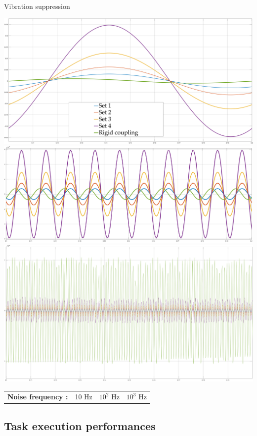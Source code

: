 \documentclass[10pt]{beamer}
\begin{document}
\begin{frame}{Vibration suppression}
  \begin{center}
    \includegraphics[width=\textwidth, height=0.21\textwidth]{../reportTeleop/Images/vibr10Htz}\\
    \smallskip
    \includegraphics[width=\textwidth, height=0.21\textwidth]{../reportTeleop/Images/vibr100Htz}\\
    \smallskip
    \includegraphics[width=\textwidth, height=0.21\textwidth]{../reportTeleop/Images/vibr1000Htz}\\
    \begin{tabular}{c  c | c | c }
      \textbf{ Noise frequency :} & 10 Hz & $10^2$ Hz & $10^3$ Hz \\
    \end{tabular}
 \end{center}
\end{frame}

\subsection*{Task execution performances}
\end{document}
